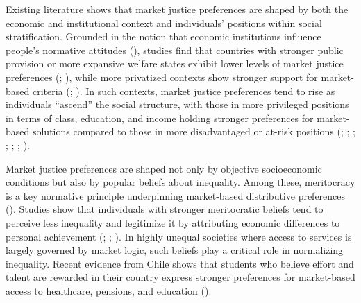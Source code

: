 \documentclass[
  13pt,
]{article}
\begin{document}
Existing literature shows that market justice preferences are shaped by
both the economic and institutional context and individuals' positions
within social stratification. Grounded in the notion that economic
institutions influence people's normative attitudes
(), studies find
that countries with stronger public provision or more expansive welfare
states exhibit lower levels of market justice preferences
(;
), while
more privatized contexts show stronger support for market-based criteria
(;
). In such contexts, market
justice preferences tend to rise as individuals ``ascend'' the social
structure, with those in more privileged positions in terms of class,
education, and income holding stronger preferences for market-based
solutions compared to those in more disadvantaged or at-risk positions
(;
;
;
;
;
;
).

Market justice preferences are shaped not only by objective
socioeconomic conditions but also by popular beliefs about inequality.
Among these, meritocracy is a key normative principle underpinning
market-based distributive preferences
(). Studies show that
individuals with stronger meritocratic beliefs tend to perceive less
inequality and legitimize it by attributing economic differences to
personal achievement (; ;
). In highly unequal
societies where access to services is largely governed by market logic,
such beliefs play a critical role in normalizing inequality. Recent
evidence from Chile shows that students who believe effort and talent
are rewarded in their country express stronger preferences for
market-based access to healthcare, pensions, and education
().
\end{document}
